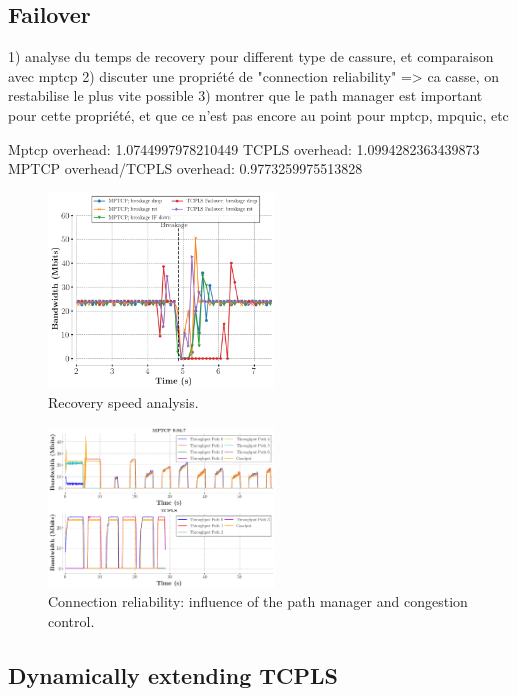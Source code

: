 \subsection{Failover}

1) analyse du temps de recovery pour different type de cassure, et comparaison avec mptcp
2) discuter une propriété de "connection reliability" => ca casse, on restabilise le plus vite possible
3) montrer que le path manager est important pour cette propriété, et que ce n'est pas encore au point pour mptcp, mpquic, etc

Mptcp overhead: 1.0744997978210449
TCPLS overhead: 1.0994282363439873
MPTCP overhead/TCPLS overhead:              0.9773259975513828


\begin{figure}[!t]
  \begin{center}
    \includegraphics[width=6cm]{figures/breakage_analysis.png}
  \end{center}
  \caption{Recovery speed analysis.}
\end{figure}


\begin{figure}[!t]
  \begin{center}
    \includegraphics[width=6cm]{figures/tcpls_mptcp.png}
  \end{center}
  \caption{Connection reliability: influence of the path manager and congestion
  control.}
\end{figure}



\subsection{Dynamically extending TCPLS}

